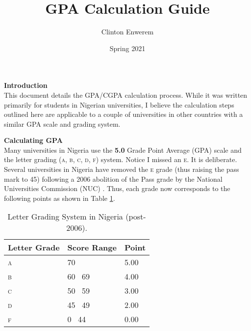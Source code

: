\documentclass[letter]{article}
\author{Clinton Enwerem}
\title{\textbf{GPA Calculation Guide}}
\date{Spring 2021}
\def\ndash{\textendash}
\begin{document}
\vspace{-5pt}
\maketitle
\thispagestyle{fancy} %
\sffamily
\textbf{Introduction}\\
\normalfont
This document details the GPA/CGPA calculation process. While it was written primarily for students in Nigerian universities, I believe the calculation steps outlined here are applicable to a couple of universities in other countries with a similar GPA scale and grading system.

\sffamily
\textbf{Calculating GPA}\\
\normalfont
Many universities in Nigeria use the \textbf{5.0} Grade Point Average (GPA) scale and the letter grading (\textsc{a, b, c, d, f}) system. Notice I missed an \textsc{e}. It is deliberate. Several universities in Nigeria have removed the \textsc{e} grade (thus raising the pass mark to 45) following a 2006 abolition of the Pass grade by the National Universities Commission (NUC) \cite{nuc2015}. Thus, each grade now corresponds to the following points as shown in Table \ref{tab:gradepts}.

\begin{table}[h]
	\centering
	\begin{tabular}{p{1cm}p{1.5cm}l}
		\hline
		\textbf{Letter Grade} & \textbf{Score Range} & \textbf{Point} \\
		\hline
		\textsc{a}            & 70 \ndash 100        & 5.00           \\
		\textsc{b}            & 60 \ndash \ 69       & 4.00           \\
		\textsc{c}            & 50 \ndash \ 59       & 3.00           \\
		\textsc{d}            & 45 \ndash \ 49       & 2.00           \\
		\textsc{f}            & 0 \ndash \ 44        & 0.00           \\
		\hline
	\end{tabular}
	\caption{Letter Grading System in Nigeria (post-2006).}
	\label{tab:gradepts}
\end{table}
\end{document}
